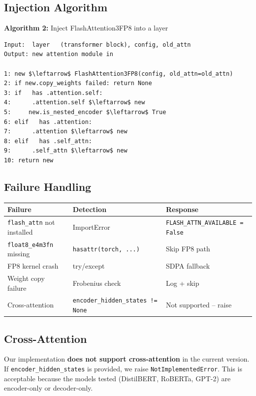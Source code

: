 \subsection{Injection Algorithm}

\textbf{Algorithm 2:} Inject FlashAttention3FP8 into a layer
\begin{lstlisting}
Input:  layer   (transformer block), config, old_attn
Output: new attention module in  

1: new $\leftarrow$ FlashAttention3FP8(config, old_attn=old_attn)
2: if new.copy_weights failed: return None
3: if   has .attention.self:
4:      .attention.self $\leftarrow$ new
5:     new.is_nested_encoder $\leftarrow$ True
6: elif   has .attention:
7:      .attention $\leftarrow$ new
8: elif   has .self_attn:
9:      .self_attn $\leftarrow$ new
10: return new
\end{lstlisting}

\subsection{Failure Handling}

\begin{table}[H]
\centering
\small
\begin{tabular}{lll}
\toprule
\textbf{Failure} & \textbf{Detection} & \textbf{Response} \\
\midrule
\texttt{flash\_attn} not installed & ImportError & \texttt{FLASH\_ATTN\_AVAILABLE = False} \\
\texttt{float8\_e4m3fn} missing & \texttt{hasattr(torch, ...)} & Skip FP8 path \\
FP8 kernel crash & try/except & SDPA fallback \\
Weight copy failure & Frobenius check & Log + skip \\
Cross-attention & \texttt{encoder\_hidden\_states != None} & Not supported -- raise \\
\bottomrule
\end{tabular}
\end{table}

\subsection{Cross-Attention}

Our implementation \textbf{does not support cross-attention} in the current 
version. If \texttt{encoder\_hidden\_states} is provided, we raise 
\texttt{NotImplementedError}. This is acceptable because the models tested 
(DistilBERT, RoBERTa, GPT-2) are encoder-only or decoder-only.

